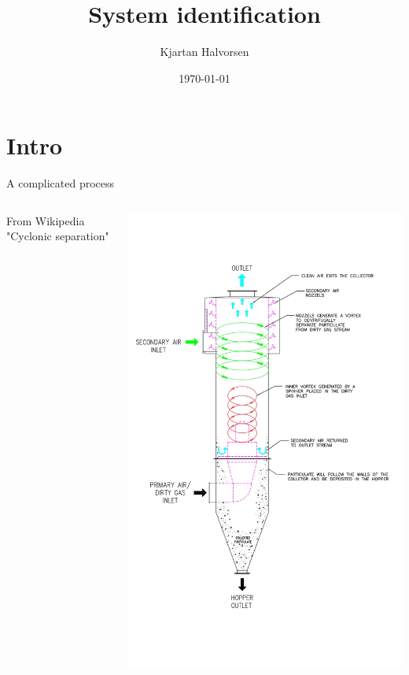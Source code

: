 \documentclass[presentation,aspectratio=169]{beamer}
\author{Kjartan Halvorsen}
\date{\today}
\title{System identification}
\begin{document}
\maketitle

\section{Intro}
\label{sec:org2f040f4}
\begin{frame}[label={sec:org0fdcf79}]{A complicated process}
\begin{columns}
\begin{column}{0.6\columnwidth}
From Wikipedia "Cyclonic separation"
\end{column}
\begin{column}{0.4\columnwidth}
\begin{center}
\includegraphics[height=1.0\textheight]{../../figures/Vertical-cyclone.jpg}
\end{center}
\end{column}
\end{columns}
\end{frame}
\end{document}
